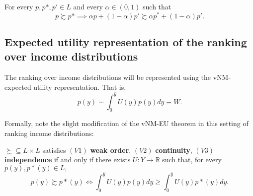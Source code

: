 \documentclass[\econtexRoot/IneqMeas]{subfiles}
\begin{document}
\begin{ax.V}[Independence]
For every $p,p*,p' \in L$ and every $\alpha \in (0,1)$ such that 
$$ p \succsim p* \implies \alpha p + (1-\alpha)p' \succsim \alpha p^* + (1-\alpha)p'. $$
\end{ax.V}

\subsection{Expected utility representation of the ranking over income distributions}

\par The ranking over income distributions will be represented using the vNM-expected utility representation. That is,
$$ p(y) \sim \int_{0}^{\bar{y}} U(y) p(y) dy \equiv W. $$

\par Formally, note the slight modification of the vNM-EU theorem in this setting of ranking income distributions:

\begin{tm}
$\succsim \subseteq L \times L$ satisfies $(V1)$ \textbf{weak order}, $(V2)$ \textbf{continuity}, $(V3)$ \textbf{independence} if and only if there exists $U: Y \to \mathbb{R}$ such that, for every $p(y), p*(y) \in L,$
$$ p(y) \succsim p*(y) \iff \int_{0}^{\bar{y}} U(y) p(y) dy \geq \int_{0}^{\bar{y}} U(y) p*(y) dy. $$
\end{tm}




\onlyinsubfile{}

\end{document}
